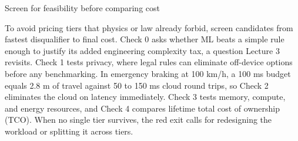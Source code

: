\documentclass[aspectratio=169, 12pt]{beamer}
\begin{document}
\begin{frame}{Screen for feasibility before comparing cost}
{    To avoid pricing tiers that physics or law already forbid, screen candidates from fastest disqualifier to final cost. Check 0 asks whether ML beats a simple rule enough to justify its added engineering complexity tax, a question Lecture 3 revisits. Check 1 tests privacy, where legal rules can eliminate off-device options before any benchmarking. In emergency braking at 100 km/h, a 100 ms budget equals 2.8 m of travel against 50 to 150 ms cloud round trips, so Check 2 eliminates the cloud on latency immediately. Check 3 tests memory, compute, and energy resources, and Check 4 compares lifetime total cost of ownership (TCO). When no single tier survives, the red exit calls for redesigning the workload or splitting it across tiers.


  }
\end{frame}
\end{document}
